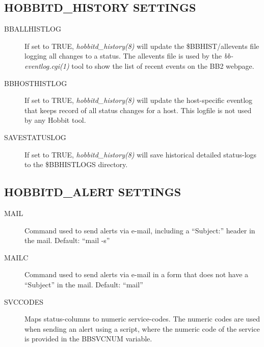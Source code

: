 \subsection{HOBBITD\_HISTORY SETTINGS}


 \begin{description}
\item[BBALLHISTLOG] If set to TRUE, \emph{hobbitd\_history(8)}
 will update the \$BBHIST/allevents file logging all changes to a status. The allevents file is used by the \emph{bb-eventlog.cgi(1)}
 tool to show the list of recent events on the BB2 webpage. 

 

\item[BBHOSTHISTLOG] If set to TRUE, \emph{hobbitd\_history(8)}
 will update the host-specific eventlog that keeps record of all status changes for a host. This logfile is not used by any Hobbit tool. 

 

\item[SAVESTATUSLOG] If set to TRUE, \emph{hobbitd\_history(8)}
 will save historical detailed status-logs to the \$BBHISTLOGS directory. 

 


 


\end{description}

\subsection{HOBBITD\_ALERT SETTINGS}


 \begin{description}
\item[MAIL] Command used to send alerts via e-mail, including a ``Subject:'' header in the mail. Default: ``mail -s'' 

 

\item[MAILC] Command used to send alerts via e-mail in a form that does not have a ``Subject'' in the mail. Default: ``mail'' 

 

\item[SVCCODES] Maps status-columns to numeric service-codes. The numeric codes are used when sending an alert using a script, where the numeric code of the service is provided in the BBSVCNUM variable. 

 


 


\end{description}

